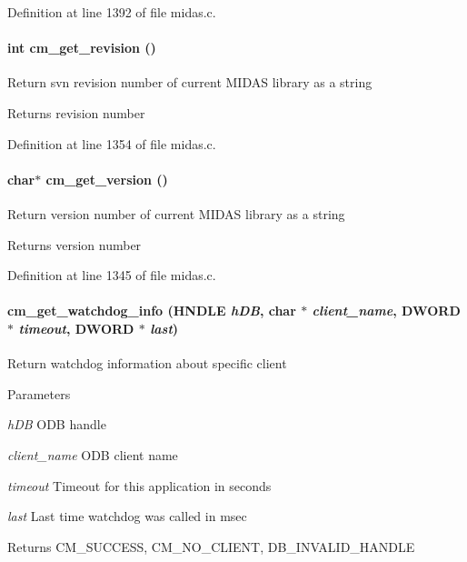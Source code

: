 Definition at line 1392 of file midas.c.
\paragraph[{cm\_\-get\_\-revision}]{\setlength{\rightskip}{0pt plus 5cm}int cm\_\-get\_\-revision ()}\hfill\label{group__cmfunctionc_ga2bdca42b13df835e667b9258cb41c7e2}
Return svn revision number of current MIDAS library as a string \begin{DoxyReturn}{Returns}
revision number 
\end{DoxyReturn}


Definition at line 1354 of file midas.c.
\paragraph[{cm\_\-get\_\-version}]{\setlength{\rightskip}{0pt plus 5cm}char$\ast$ cm\_\-get\_\-version ()}\hfill\label{group__cmfunctionc_ga9e7d38eff9b9d85d57fc2f4b2aacc9ab}
Return version number of current MIDAS library as a string \begin{DoxyReturn}{Returns}
version number 
\end{DoxyReturn}


Definition at line 1345 of file midas.c.
\paragraph[{cm\_\-get\_\-watchdog\_\-info}]{ cm\_\-get\_\-watchdog\_\-info (HNDLE {\em hDB}, \/  char $\ast$ {\em client\_\-name}, \/  {\bf DWORD} $\ast$ {\em timeout}, \/  {\bf DWORD} $\ast$ {\em last})}\hfill\label{group__cmfunctionc_ga31688f905a1b4a3271dfea8b178e1108}
Return watchdog information about specific client 
\begin{DoxyParams}{Parameters}
\item[{\em hDB}]ODB handle \item[{\em client\_\-name}]ODB client name \item[{\em timeout}]Timeout for this application in seconds \item[{\em last}]Last time watchdog was called in msec \end{DoxyParams}
\begin{DoxyReturn}{Returns}
CM\_\-SUCCESS, CM\_\-NO\_\-CLIENT, DB\_\-INVALID\_\-HANDLE 
\end{DoxyReturn}


